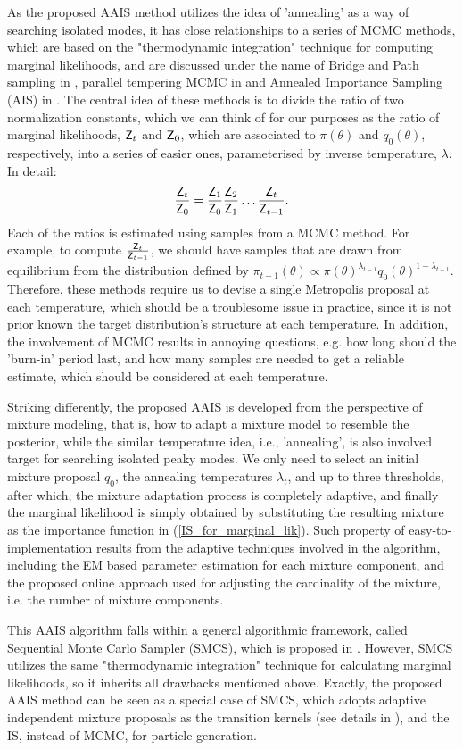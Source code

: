 As the proposed AAIS method utilizes the idea of 'annealing' as a
way of searching isolated modes, it has close relationships to a
series of MCMC methods, which are based on the "thermodynamic
integration" technique for computing marginal likelihoods, and are
discussed under the name of Bridge and Path sampling in
\cite{gelman1998simulating}, parallel tempering MCMC in
\cite{gregory2010bayesian,gregory2005bayesian} and Annealed
Importance Sampling (AIS) in \cite{neal2001ais}. The central idea of
these methods is to divide the ratio of two normalization constants,
which we can think of for our purposes as the ratio of marginal
likelihoods, $\textsf{Z}_t$ and $\textsf{Z}_0$, which are associated to
$\pi(\theta)$ and $q_0(\theta)$, respectively, into a series of
easier ones, parameterised by inverse temperature, $\lambda$. In
detail:
\begin{equation}
\frac{\Z_t}{\Z_0}=\frac{\Z_1}{\Z_0}\frac{\Z_2}{\Z_1}\dots\frac{\Z_t}{\Z_{t-1}}.
\end{equation}
Each of the ratios is estimated using samples from a MCMC method.
For example, to compute $\frac{\textsf{Z}_t}{\textsf{Z}_{t-1}}$, we should have
samples that are drawn from equilibrium from the distribution
defined by
$\pi_{t-1}(\theta)\propto\pi(\theta)^{\lambda_{t-1}}q_0(\theta)^{1-\lambda_{t-1}}$.
Therefore, these methods require us to devise a single Metropolis
proposal at each temperature, which should be a troublesome issue in
practice, since it is not prior known the target distribution's
structure at each temperature. In addition, the involvement of MCMC
results in annoying questions, e.g. how long should the 'burn-in'
period last, and how many samples are needed to get a reliable
estimate, which should be considered at each temperature.

Striking differently, the proposed AAIS is developed from the
perspective of mixture modeling, that is, how to adapt a mixture
model to resemble the posterior, while the similar temperature idea,
i.e., 'annealing', is also involved target for searching isolated
peaky modes. We only need to select an initial mixture proposal
$q_0$, the annealing temperatures $\lambda_t$, and up to three
thresholds, after which, the mixture adaptation process is
completely adaptive, and finally the marginal likelihood is simply
obtained by substituting the resulting mixture as the importance
function in (\ref{IS_for_marginal_lik}). Such property of
easy-to-implementation results from the adaptive techniques involved
in the algorithm, including the EM based parameter estimation for
each mixture component, and the proposed online approach used for
adjusting the cardinality of the mixture, i.e. the number of mixture
components.

This AAIS algorithm falls within a general algorithmic framework,
called Sequential Monte Carlo Sampler (SMCS), which is proposed in
\cite{del2007sequential,del2006sequential}. However, SMCS utilizes
the same "thermodynamic integration" technique for calculating
marginal likelihoods, so it inherits all drawbacks mentioned above.
Exactly, the proposed AAIS method can be seen as a special case of
SMCS, which adopts adaptive independent mixture proposals as the
transition kernels (see details in
\cite{del2007sequential,del2006sequential}), and the IS, instead of
MCMC, for particle generation.

